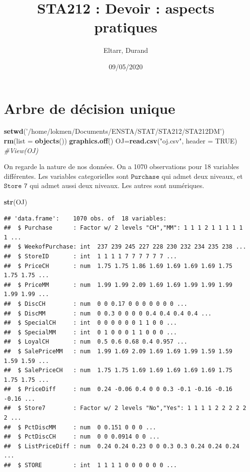\documentclass[]{article}
\title{STA212 : Devoir : aspects pratiques}
\author{Eltarr, Durand}
\date{09/05/2020}
\newenvironment{Shaded}{\begin{snugshade}}{\end{snugshade}}
\newcommand{\CommentTok}[1]{\textcolor[rgb]{0.56,0.35,0.01}{\textit{#1}}}
\newcommand{\DataTypeTok}[1]{\textcolor[rgb]{0.13,0.29,0.53}{#1}}
\newcommand{\KeywordTok}[1]{\textcolor[rgb]{0.13,0.29,0.53}{\textbf{#1}}}
\newcommand{\NormalTok}[1]{#1}
\newcommand{\OtherTok}[1]{\textcolor[rgb]{0.56,0.35,0.01}{#1}}
\newcommand{\StringTok}[1]{\textcolor[rgb]{0.31,0.60,0.02}{#1}}
\begin{document}
\maketitle

\hypertarget{arbre-de-duxe9cision-unique}{%
\section{Arbre de décision unique}\label{arbre-de-duxe9cision-unique}}

\begin{Shaded}
\begin{Highlighting}[]
\KeywordTok{setwd}\NormalTok{(}\StringTok{'/home/lokmen/Documents/ENSTA/STAT/STA212/STA212DM'}\NormalTok{)}
\KeywordTok{rm}\NormalTok{(}\DataTypeTok{list =} \KeywordTok{objects}\NormalTok{())}
\KeywordTok{graphics.off}\NormalTok{()}
\NormalTok{OJ=}\KeywordTok{read.csv}\NormalTok{(}\StringTok{"oj.csv"}\NormalTok{, }\DataTypeTok{header =} \OtherTok{TRUE}\NormalTok{)}
\CommentTok{#View(OJ)}
\end{Highlighting}
\end{Shaded}

On regarde la nature de nos données. On a 1070 observations pour 18
variables différentes. Les variables categorielles sont
\(\texttt{Purchase}\) qui admet deux niveaux, et \(\texttt{Store 7}\)
qui admet aussi deux niveaux. Les autres sont numériques.

\begin{Shaded}
\begin{Highlighting}[]
\KeywordTok{str}\NormalTok{(OJ) }
\end{Highlighting}
\end{Shaded}

\begin{verbatim}
## 'data.frame':    1070 obs. of  18 variables:
##  $ Purchase      : Factor w/ 2 levels "CH","MM": 1 1 1 2 1 1 1 1 1 1 ...
##  $ WeekofPurchase: int  237 239 245 227 228 230 232 234 235 238 ...
##  $ StoreID       : int  1 1 1 1 7 7 7 7 7 7 ...
##  $ PriceCH       : num  1.75 1.75 1.86 1.69 1.69 1.69 1.69 1.75 1.75 1.75 ...
##  $ PriceMM       : num  1.99 1.99 2.09 1.69 1.69 1.99 1.99 1.99 1.99 1.99 ...
##  $ DiscCH        : num  0 0 0.17 0 0 0 0 0 0 0 ...
##  $ DiscMM        : num  0 0.3 0 0 0 0 0.4 0.4 0.4 0.4 ...
##  $ SpecialCH     : int  0 0 0 0 0 0 1 1 0 0 ...
##  $ SpecialMM     : int  0 1 0 0 0 1 1 0 0 0 ...
##  $ LoyalCH       : num  0.5 0.6 0.68 0.4 0.957 ...
##  $ SalePriceMM   : num  1.99 1.69 2.09 1.69 1.69 1.99 1.59 1.59 1.59 1.59 ...
##  $ SalePriceCH   : num  1.75 1.75 1.69 1.69 1.69 1.69 1.69 1.75 1.75 1.75 ...
##  $ PriceDiff     : num  0.24 -0.06 0.4 0 0 0.3 -0.1 -0.16 -0.16 -0.16 ...
##  $ Store7        : Factor w/ 2 levels "No","Yes": 1 1 1 1 2 2 2 2 2 2 ...
##  $ PctDiscMM     : num  0 0.151 0 0 0 ...
##  $ PctDiscCH     : num  0 0 0.0914 0 0 ...
##  $ ListPriceDiff : num  0.24 0.24 0.23 0 0 0.3 0.3 0.24 0.24 0.24 ...
##  $ STORE         : int  1 1 1 1 0 0 0 0 0 0 ...
\end{verbatim}
\end{document}
